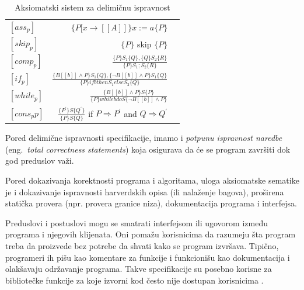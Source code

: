 \documentclass[a4paper]{article}
\begin{document}
\begin{table}[h]
  \caption{Aksiomatski sistem za delimičnu ispravnost}\label{tab:a}
    \begin{center}
        \begin{tabular}{lrc}\hline
        \hline
        \hline
        $[ass_{p}] $ & $ \{ P[x \rightarrow [\![A]\!]\} x:= a \{P\}$    \\  [6pt]
        $[skip_{p}] $ & $ \{P\}$ skip  $ \{P\}$   \\ [6pt]
         $[comp_{p}] $ & $  \frac{\{P\}S_1\{Q\},\{Q\}S_2\{R\}}{\{P\}S_1;S_2\{R\}} $ \\[6pt]
            $[if_{p}] $ & $  \frac{\{B[\![b]\!]\land P\}S_1\{Q\},\{\neg B[\![b]\!]\land P\}S_1\{Q\}}{\{P\} if b then S_1 else S_2\{Q\}} $ \\ [6pt]
        $[while_{p}] $ & $  \frac{\{B[\![b]\!]\land P\}S\{P\}}{\{P\} while b do S \{\neg B[\![b]\!]\land P\}} $ \\ [6pt]
          $[cons_p{p}] $ & $  \frac{\{P^{'}\}S\{Q^{'}\}}{\{P\}S\{Q\}} $ if $ P \Rightarrow	 P^{'} $ and $ Q \Rightarrow	 Q^{'} $  \\ [6pt]
          \hline \hline
        \end{tabular}
    \end{center}
\end{table}






Pored delimične ispravnosti specifikacije, imamo i \textit {potpunu ispravnost naredbe } (eng.~{\em  total correctness statements}) koja osigurava da će se program završiti dok god preduslov važi.

Pored dokazivanja korektnosti programa i algoritama, uloga aksiomatske sematike je i dokazivanje ispravnosti harverdskih opisa (ili nalaženje bagova), proširena statička provera (npr. provera granice niza), dokumentacija programa i interfejsa.

Preduslovi i postuslovi mogu se smatrati interfejsom ili ugovorom između programa i njegovih klijenata. Oni pomažu korisnicima da razumeju šta program treba da proizvede bez potrebe da shvati kako se program izvršava. Tipično, programeri ih pišu kao komentare za funkcije i
funkcionišu kao dokumentacija i olakšavaju održavanje programa. Takve specifikacije su posebno
korisne za bibliotečke funkcije za koje izvorni kod često nije dostupan korisnicima \cite{adrian}.
\end{document}
